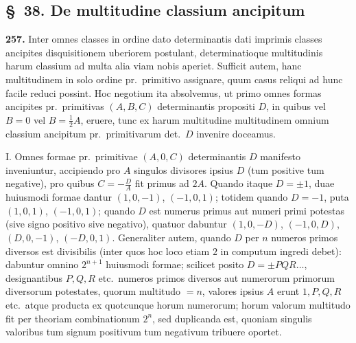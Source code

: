 \documentclass[12pt,a4paper]{article}
\theoremstyle{plain}
\theoremstyle{definition}
\theoremstyle{remark}
\theoremstyle{problemstyle}
\begin{document}
\subsection*{\S\ 38. De multitudine classium ancipitum}

\textbf{257.} Inter omnes classes in ordine dato determinantis dati imprimis classes ancipites disquisitionem uberiorem postulant, determinatioque multitudinis harum classium ad multa alia viam nobis aperiet. Sufficit autem, hanc multitudinem in solo ordine pr.\ primitivo assignare, quum casus reliqui ad hunc facile reduci possint. Hoc negotium ita absolvemus, ut primo omnes formas ancipites pr.\ primitivas $(A, B, C)$ determinantis propositi $D$, in quibus vel $B = 0$ vel $B = \tfrac{1}{2}A$, eruere, tunc ex harum multitudine multitudinem omnium classium ancipitum pr.\ primitivarum det.\ $D$ invenire doceamus.

I. Omnes formae pr.\ primitivae $(A, 0, C)$ determinantis $D$ manifesto inveniuntur, accipiendo pro $A$ singulos divisores ipsius $D$ (tum positive tum negative), pro quibus $C = -\frac{D}{A}$ fit primus ad $2A$. Quando itaque $D = \pm 1$, duae huiusmodi formae dantur $(1, 0, -1)$, $(-1, 0, 1)$; totidem quando $D = -1$, puta $(1, 0, 1)$, $(-1, 0, 1)$; quando $D$ est numerus primus aut numeri primi potestas (sive signo positivo sive negativo), quatuor dabuntur $(1, 0, -D)$, $(-1, 0, D)$, $(D, 0, -1)$, $(-D, 0, 1)$. Generaliter autem, quando $D$ per $n$ numeros primos diversos est divisibilis (inter quos hoc loco etiam $2$ in computum ingredi debet): dabuntur omnino $2^{n+1}$ huiusmodi formae; scilicet posito $D = \pm PQR\ldots$, designantibus $P, Q, R$ etc.\ numeros primos diversos aut numerorum primorum diversorum potestates, quorum multitudo $= n$, valores ipsius $A$ erunt $1, P, Q, R$ etc.\ atque producta ex quotcunque horum numerorum; horum valorum multitudo fit per theoriam combinationum $2^n$, sed duplicanda est, quoniam singulis valoribus tum signum positivum tum negativum tribuere oportet.
\end{document}
